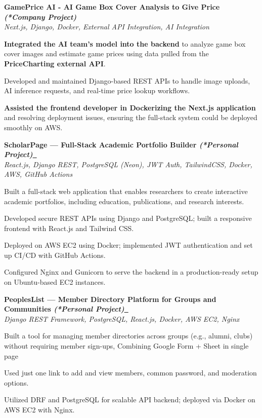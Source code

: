 \documentclass[letterpaper,10pt]{article}
\let\hrefWithoutArrow\href
\newcommand{\hrefWithArrow}[2]{\hrefWithoutArrow{#1}{#2\ \raisebox{.15ex}{\footnotesize \faExternalLink*}}}
\newcommand{\heading}[2]{
  \hspace{10pt}#1\hfill#2\\
}
\newcommand{\headingBf}[2]{
  \heading{\textbf{#1}}{\textbf{#2}}
}
\newcommand{\headingIt}[2]{
  \heading{\textit{#1}}{\textit{#2}}
}
\newenvironment{resume_list}{
  \vspace{-7pt}
  \begin{itemize}[itemsep=-2px, parsep=1pt, leftmargin=30pt]
}{
  \end{itemize}
}
\begin{document}
\headingBf{GamePrice AI - AI Game Box Cover Analysis to Give Price \textit{(*Company Project)}}{}

\headingIt{Next.js, Django, Docker, External API Integration, AI Integration}{}
\begin{resume_list}
    \item \textbf{Integrated the AI team’s model into the backend} to analyze game box cover images and estimate game prices using data pulled from the \textbf{PriceCharting external API}.
    \item Developed and maintained Django-based REST APIs to handle image uploads, AI inference requests, and real-time price lookup workflows.
    \item \textbf{Assisted the frontend developer in Dockerizing the Next.js application} and resolving deployment issues, ensuring the full-stack system could be deployed smoothly on AWS.
\end{resume_list}

\headingBf{ScholarPage — Full-Stack Academic Portfolio Builder \textit{(*Personal Project)}}{\textcolor[HTML]{336e55}{\hrefWithArrow{https://github.com/shemanto27/ScholarPage}{\textbullet{Project Link}}}}

\headingIt{React.js, Django REST, PostgreSQL (Neon), JWT Auth, TailwindCSS, Docker, AWS, GitHub Actions}{}
\begin{resume_list}
    \item Built a full-stack web application that enables researchers to create interactive academic portfolios, including education, publications, and research interests.
    \item Developed secure REST APIs using Django and PostgreSQL; built a responsive frontend with React.js and Tailwind CSS.
    \item Deployed on AWS EC2 using Docker; implemented JWT authentication and set up CI/CD with GitHub Actions.
    \item Configured Nginx and Gunicorn to serve the backend in a production-ready setup on Ubuntu-based EC2 instances.
\end{resume_list}

\headingBf{PeoplesList — Member Directory Platform for Groups and Communities \textit{(*Personal Project)}}{\textcolor[HTML]{336e55}{\hrefWithArrow{https://github.com/shemanto27/PeoplesList}{\textbullet{Project Link}}}}

\headingIt{Django REST Framework, PostgreSQL, React.js, Docker, AWS EC2, Nginx}{}
\begin{resume_list}
    \item Built a tool for managing member directories across groups (e.g., alumni, clubs) without requiring member sign-ups, Combining Google Form + Sheet in single page
    \item Used just one link to add and view members, common password, and moderation options.
    \item Utilized DRF and PostgreSQL for scalable API backend; deployed via Docker on AWS EC2 with Nginx.
\end{resume_list}
\end{document}

